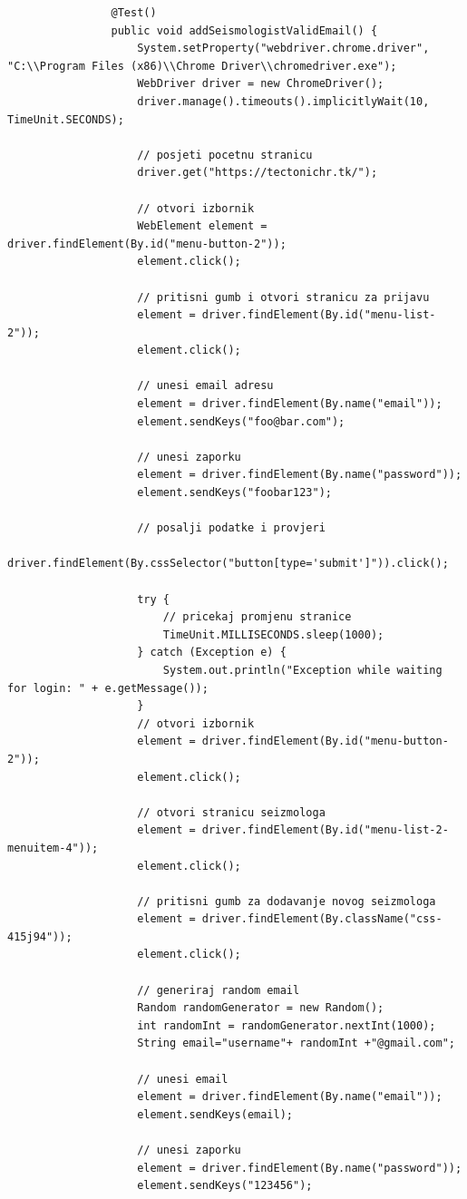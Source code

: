 			 \begin{lstlisting}
				@Test()
				public void addSeismologistValidEmail() {
					System.setProperty("webdriver.chrome.driver", "C:\\Program Files (x86)\\Chrome Driver\\chromedriver.exe");
					WebDriver driver = new ChromeDriver();
					driver.manage().timeouts().implicitlyWait(10, TimeUnit.SECONDS);

					// posjeti pocetnu stranicu
					driver.get("https://tectonichr.tk/");

					// otvori izbornik
					WebElement element = driver.findElement(By.id("menu-button-2"));
					element.click();

					// pritisni gumb i otvori stranicu za prijavu
					element = driver.findElement(By.id("menu-list-2"));
					element.click();

					// unesi email adresu
					element = driver.findElement(By.name("email"));
					element.sendKeys("foo@bar.com");

					// unesi zaporku
					element = driver.findElement(By.name("password"));
					element.sendKeys("foobar123");

					// posalji podatke i provjeri
					driver.findElement(By.cssSelector("button[type='submit']")).click();
					
					try {
						// pricekaj promjenu stranice
						TimeUnit.MILLISECONDS.sleep(1000);
					} catch (Exception e) {
						System.out.println("Exception while waiting for login: " + e.getMessage());
					}
					// otvori izbornik
					element = driver.findElement(By.id("menu-button-2"));
					element.click();

					// otvori stranicu seizmologa
					element = driver.findElement(By.id("menu-list-2-menuitem-4"));
					element.click();

					// pritisni gumb za dodavanje novog seizmologa
					element = driver.findElement(By.className("css-415j94"));
					element.click();

					// generiraj random email
					Random randomGenerator = new Random();  
					int randomInt = randomGenerator.nextInt(1000);  
					String email="username"+ randomInt +"@gmail.com";

					// unesi email
					element = driver.findElement(By.name("email"));
					element.sendKeys(email);

					// unesi zaporku
					element = driver.findElement(By.name("password"));
					element.sendKeys("123456");
					

\end{lstlisting}
